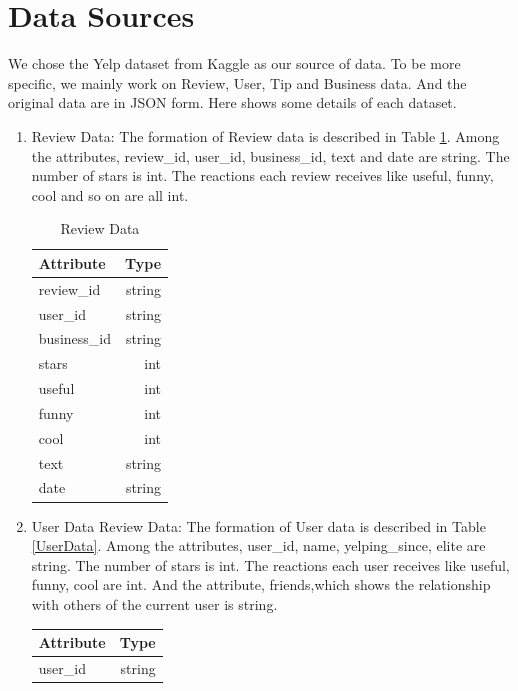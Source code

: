 \documentclass{stylefiles/capstone}
\begin{document}
\section{Data Sources}
We chose the Yelp dataset\cite{yelpdatasetref} from Kaggle as our source of data. To be more specific, we mainly work on Review, User, Tip and Business data. And the original data are in JSON form. Here shows some details of each dataset.
\begin{enumerate}
    \item Review Data: The formation of Review data is described in Table \ref{ReviewData}. Among the attributes, review\_id, user\_id, business\_id, text and date are string. The number of stars is int. The reactions each review receives like useful, funny, cool and so on are all int.
    \begin{table}[h!]
        \centering
        \begin{tabular}{l r } 
         \hline
         Attribute &  Type \\ [0.5ex] 
         \hline
        review\_id & string\\
        user\_id & string\\
        business\_id & string \\
        stars  &  int\\
        useful  &  int\\
        funny   &  int\\
        cool & int\\
        text & string\\
        date & string\\
         [1ex] 
         \hline
        \end{tabular}
        \caption{Review Data}
    \label{ReviewData}
    \end{table}
    \item User Data
    Review Data: The formation of User data is described in Table \ref{UserData}. Among the attributes, user\_id, name, yelping\_since, elite are string. The number of stars is int. The reactions each user receives like useful, funny, cool are int. And the attribute, friends,which shows the relationship with others of the current user is string.
    \begin{table}[h!]
        \centering
        \begin{tabular}{l r } 
         \hline
         Attribute &  Type \\ [0.5ex] 
         \hline
        user\_id & string\\

\end{tabular}
\end{table}
\end{enumerate}
\end{document}
